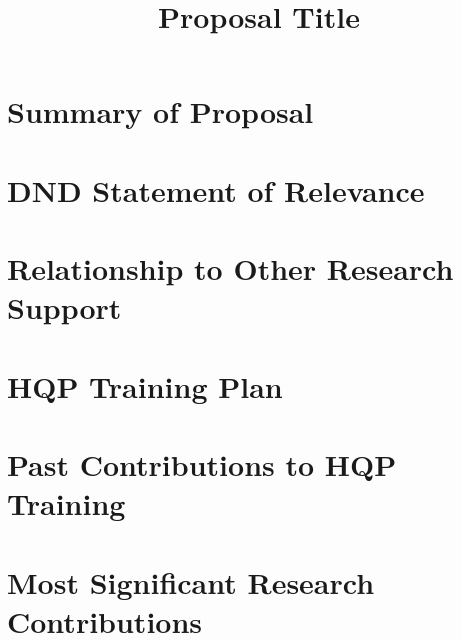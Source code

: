 \documentclass[12pt,english]{nserc-appendix}
\begin{document}
\title{Proposal Title}


\maketitle

\section{Summary of Proposal}

\clearpage

\section{DND Statement of Relevance}

\clearpage

\setcounter{page}{1}
\section{Relationship to Other Research Support}

\clearpage

\setcounter{page}{1}
\section{HQP Training Plan}

\clearpage

\setcounter{page}{1}
\section{Past Contributions to HQP Training}

\clearpage

\setcounter{page}{1}
\section{Most Significant Research Contributions}

\clearpage

\setcounter{page}{1}
\end{document}
